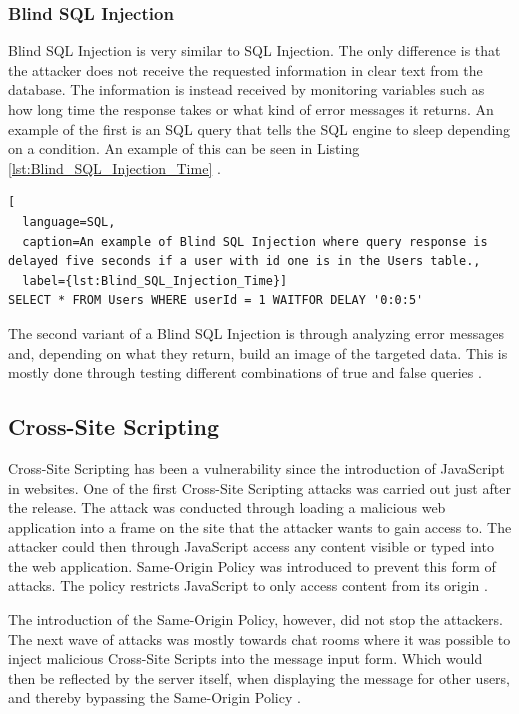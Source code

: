 \subsubsection{Blind SQL Injection}
Blind SQL Injection is very similar to SQL Injection. The only difference is that the attacker does not receive the requested information in clear text from the database. The information is instead received by monitoring variables such as how long time the response takes or what kind of error messages it returns. An example of the first is an SQL query that tells the SQL engine to sleep depending on a condition. An example of this can be seen in Listing \ref{lst:Blind_SQL_Injection_Time} \parencite{JustinClarke-Salt2009SIAa, Secure_Web}.

\hfill
\begin{lstlisting}[
  language=SQL,
  caption=An example of Blind SQL Injection where query response is delayed five seconds if a user with id one is in the Users table.,
  label={lst:Blind_SQL_Injection_Time}]
SELECT * FROM Users WHERE userId = 1 WAITFOR DELAY '0:0:5'
\end{lstlisting}
\hfill

The second variant of a Blind SQL Injection is through analyzing error messages and, depending on what they return, build an image of the targeted data. This is mostly done through testing different combinations of true and false queries \parencite{JustinClarke-Salt2009SIAa, Secure_Web}.



\subsection{Cross-Site Scripting}
Cross-Site Scripting has been a vulnerability since the introduction of JavaScript in websites. One of the first Cross-Site Scripting attacks was carried out just after the release. The attack was conducted through loading a malicious web application into a frame on the site that the attacker wants to gain access to. The attacker could then through JavaScript access any content visible or typed into the web application. Same-Origin Policy was introduced to prevent this form of attacks. The policy restricts JavaScript to only access content from its origin \parencite{FogieSeth2007Xacs, w3csop}.

The introduction of the Same-Origin Policy, however, did not stop the attackers. The next wave of attacks was mostly towards chat rooms where it was possible to inject malicious Cross-Site Scripts into the message input form. Which would then be reflected by the server itself, when displaying the message for other users, and thereby bypassing the Same-Origin Policy \parencite{FogieSeth2007Xacs}.

